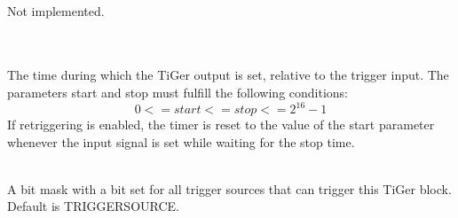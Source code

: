 	\\
	Not implemented.


	\\
	\\
	The time during which the TiGer output is set, relative to the trigger input. The parameters \textsf{start} and \textsf{stop} must fulfill the following conditions:
	\[ 0 <= start <= stop <= 2^{16}-1 \]
	If retriggering is enabled, the timer is reset to the value of the start parameter whenever the input signal is set while waiting for the stop time. \par
	

	\\
	A bit mask with a bit set for all trigger sources that can trigger this TiGer block. 
	Default is \textsf{\PREFIX TRIGGER\tu SOURCE\tu {}}.\par


